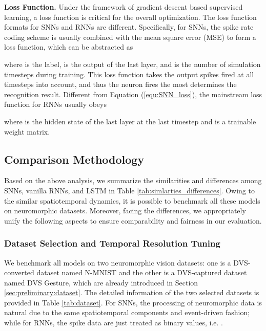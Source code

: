 \documentclass[journal,10pt,twocolumn]{IEEETran}
\begin{document}
\textbf{Loss Function.} Under the framework of gradient descent based supervised learning, a loss function is critical for the overall optimization. The loss function formats for SNNs and RNNs are different. Specifically, for SNNs, the spike rate coding scheme is usually combined with the mean square error (MSE) to form a loss function, which can be abstracted as

where  is the label,  is the output of the last layer, and  is the number of simulation timesteps during training. This loss function takes the output spikes fired at all timesteps into account, and thus the neuron fires the most determines the recognition result. Different from Equation (\ref{equ:SNN_loss}), the mainstream loss function for RNNs usually obeys

where  is the hidden state of the last layer at the last timestep and  is a trainable weight matrix.

\subsection{Comparison Methodology}

Based on the above analysis, we summarize the similarities and differences among SNNs, vanilla RNNs, and LSTM in Table \ref{tab:simlarties_differences}. Owing to the similar spatiotemporal dynamics, it is possible to benchmark all these models on neuromorphic datasets. Moreover, facing the differences, we appropriately unify the following aspects to ensure comparability and fairness in our evaluation. 

\bigskip
\subsubsection{Dataset Selection and Temporal Resolution Tuning}\quad

We benchmark all models on two neuromorphic vision datasets: one is a DVS-converted dataset named N-MNIST and the other is a DVS-captured dataset named DVS Gesture, which are already introduced in Section \ref{sec:preliminary:dataset}. The detailed information of the two selected datasets is provided in Table \ref{tab:dataset}. For SNNs, the processing of neuromorphic data is natural due to the same spatiotemporal components and event-driven fashion; while for RNNs, the spike data are just treated as binary values, i.e. . 
\end{document}
